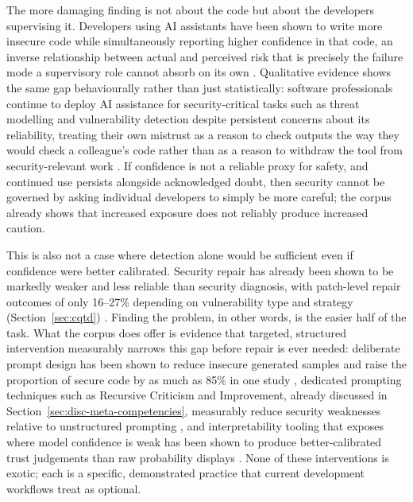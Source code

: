 The more damaging finding is not about the code but about the developers supervising it. Developers using AI assistants have been shown to write more insecure code while simultaneously reporting higher confidence in that code, an inverse relationship between actual and perceived risk that is precisely the failure mode a supervisory role cannot absorb on its own \cite{perry_users_2023}. Qualitative evidence shows the same gap behaviourally rather than just statistically: software professionals continue to deploy AI assistance for security-critical tasks such as threat modelling and vulnerability detection despite persistent concerns about its reliability, treating their own mistrust as a reason to check outputs the way they would check a colleague's code rather than as a reason to withdraw the tool from security-relevant work \cite{klemmer_using_2024}. If confidence is not a reliable proxy for safety, and continued use persists alongside acknowledged doubt, then security cannot be governed by asking individual developers to simply be more careful; the corpus already shows that increased exposure does not reliably produce increased caution.

This is also not a case where detection alone would be sufficient even if confidence were better calibrated. Security repair has already been shown to be markedly weaker and less reliable than security diagnosis, with patch-level repair outcomes of only 16--27\% depending on vulnerability type and strategy (Section~\ref{sec:cqtd}) \cite{alrashedy_can_2024}. Finding the problem, in other words, is the easier half of the task. What the corpus does offer is evidence that targeted, structured intervention measurably narrows this gap before repair is ever needed: deliberate prompt design has been shown to reduce insecure generated samples and raise the proportion of secure code by as much as 85\% in one study \cite{res_enhancing_2024}, dedicated prompting techniques such as Recursive Criticism and Improvement, already discussed in Section~\ref{sec:disc-meta-competencies}, measurably reduce security weaknesses relative to unstructured prompting \cite{tony_prompting_2025}, and interpretability tooling that exposes where model confidence is weak has been shown to produce better-calibrated trust judgements than raw probability displays \cite{palacio_towards_2025}. None of these interventions is exotic; each is a specific, demonstrated practice that current development workflows treat as optional.

